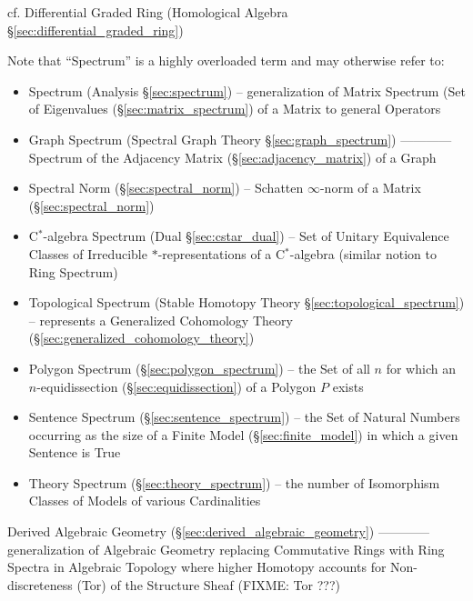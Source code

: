 cf. Differential Graded Ring (Homological Algebra
\S\ref{sec:differential_graded_ring})

\fist Note that ``Spectrum'' is a highly overloaded term and may otherwise
refer to:
\begin{itemize}
  \item Spectrum (Analysis \S\ref{sec:spectrum}) -- generalization of Matrix
    Spectrum (Set of Eigenvalues (\S\ref{sec:matrix_spectrum}) of a Matrix to
    general Operators

  \item Graph Spectrum (Spectral Graph Theory \S\ref{sec:graph_spectrum}) ------------
    Spectrum of the Adjacency Matrix (\S\ref{sec:adjacency_matrix}) of a Graph

  \item Spectral Norm (\S\ref{sec:spectral_norm}) -- Schatten $\infty$-norm of
    a Matrix (\S\ref{sec:spectral_norm})

  \item C$^*$-algebra Spectrum (Dual \S\ref{sec:cstar_dual}) -- Set of Unitary
    Equivalence Classes of Irreducible $*$-representations of a C$^*$-algebra
    (similar notion to Ring Spectrum)

  \item Topological Spectrum (Stable Homotopy Theory
    \S\ref{sec:topological_spectrum}) -- represents a Generalized Cohomology
    Theory (\S\ref{sec:generalized_cohomology_theory})

  \item Polygon Spectrum (\S\ref{sec:polygon_spectrum}) -- the Set of all $n$
    for which an $n$-equidissection (\S\ref{sec:equidissection}) of a Polygon
    $P$ exists

  \item Sentence Spectrum (\S\ref{sec:sentence_spectrum}) -- the Set of Natural
    Numbers occurring as the size of a Finite Model (\S\ref{sec:finite_model})
    in which a given Sentence is True
  \item Theory Spectrum (\S\ref{sec:theory_spectrum}) -- the number of
    Isomorphism Classes of Models of various Cardinalities
\end{itemize}

\fist Derived Algebraic Geometry (\S\ref{sec:derived_algebraic_geometry}) ------------
generalization of Algebraic Geometry replacing Commutative Rings with Ring
Spectra in Algebraic Topology where higher Homotopy accounts for
Non-discreteness (Tor) of the Structure Sheaf (FIXME: Tor ???)

